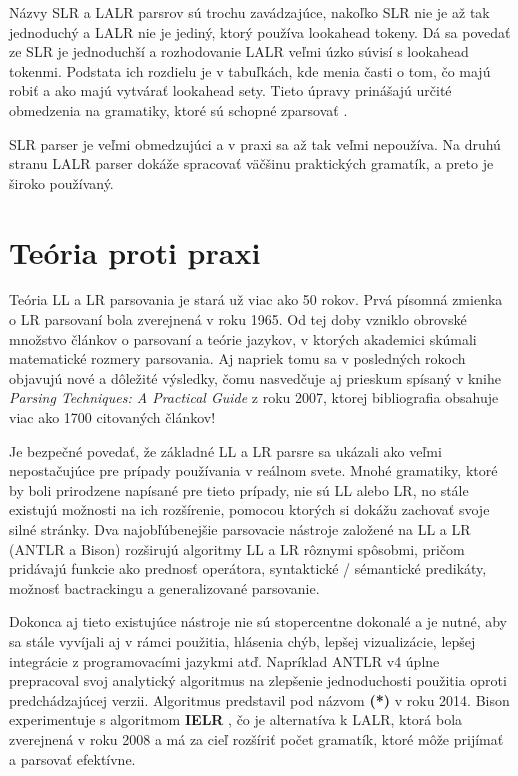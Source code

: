 Názvy SLR a LALR parsrov sú trochu zavádzajúce, nakoľko SLR nie je až tak jednoduchý a LALR nie je jediný, ktorý používa lookahead tokeny. Dá sa povedať ze SLR je jednoduchší a rozhodovanie LALR veľmi úzko súvisí s lookahead tokenmi. Podstata ich rozdielu je v tabuľkách, kde menia časti o tom, čo majú robiť a ako majú vytvárať lookahead sety. Tieto úpravy prinášajú určité obmedzenia na gramatiky, ktoré sú schopné zparsovať \cite{tomassetti:parsing}.

SLR parser je veľmi obmedzujúci a v praxi sa až tak veľmi nepoužíva. Na druhú stranu LALR parser dokáže spracovať väčšinu praktických gramatík, a preto je široko používaný.

\section{Teória proti praxi}
Teória LL a LR parsovania je stará už viac ako 50 rokov. Prvá písomná zmienka o LR parsovaní \cite{LR} bola zverejnená v roku 1965. Od tej doby vzniklo obrovské množstvo  článkov o parsovaní a teórie jazykov, v ktorých akademici skúmali matematické rozmery parsovania. Aj napriek tomu sa v posledných rokoch objavujú nové a dôležité výsledky, čomu nasvedčuje aj prieskum spísaný v knihe \textit{Parsing Techniques: A Practical Guide} \cite{grune2007parsing} z roku 2007, ktorej bibliografia obsahuje viac ako 1700 citovaných článkov! \cite{haberman:hard_parsing}

Je bezpečné povedať, že základné LL a LR parsre sa ukázali ako veľmi nepostačujúce pre prípady používania v reálnom svete. Mnohé gramatiky, ktoré by boli prirodzene napísané pre tieto prípady, nie sú LL alebo LR, no stále existujú možnosti na ich rozšírenie, pomocou ktorých si dokážu zachovať svoje silné stránky. Dva najobľúbenejšie parsovacie nástroje založené na LL a LR (ANTLR a Bison) rozširujú algoritmy LL a LR rôznymi spôsobmi, pričom pridávajú funkcie ako prednosť operátora, syntaktické / sémantické predikáty, možnosť bactrackingu a generalizované parsovanie.

Dokonca aj tieto existujúce nástroje nie sú stopercentne dokonalé a je nutné, aby sa stále vyvíjali aj v rámci použitia, hlásenia chýb, lepšej vizualizácie, lepšej integrácie z programovacími jazykmi atď. Napríklad ANTLR v4 úplne prepracoval svoj analytický algoritmus na zlepšenie jednoduchosti použitia oproti predchádzajúcej verzii. Algoritmus predstavil pod názvom \textbf{(*)}\cite{ALL} v roku 2014. Bison experimentuje s algoritmom \textbf{IELR} \cite{IELR}, čo je alternatíva k LALR, ktorá bola zverejnená v roku 2008 a má za cieľ rozšíriť počet gramatík, ktoré môže prijímať a parsovať efektívne.


